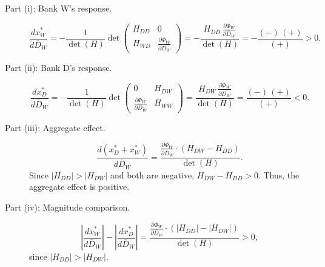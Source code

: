 \documentclass[12pt]{article}
\begin{document}
\begin{description}
    \item[Part (i): Bank W's response.]
    \begin{equation*}
    \frac{dx_{W}^{*}}{d\overline{D}_{W}} 
    = -\frac{1}{\det(H)} 
    \det\begin{pmatrix} H_{DD} & 0 \\ H_{WD} & \frac{\partial\Phi_{W}}{\partial\overline{D}_{W}} \end{pmatrix}
    = -\frac{H_{DD} \, \frac{\partial\Phi_{W}}{\partial\overline{D}_{W}}}{\det(H)}
    = -\frac{(-) \, (+)}{(+)} > 0.
    \end{equation*}
    \item[Part (ii): Bank D's response.]
    \begin{equation*}
    \frac{dx_{D}^{*}}{d\overline{D}_{W}} 
    = -\frac{1}{\det(H)} 
    \det\begin{pmatrix} 0 & H_{DW} \\ \frac{\partial\Phi_{W}}{\partial\overline{D}_{W}} & H_{WW} \end{pmatrix}
    = \frac{H_{DW} \, \frac{\partial\Phi_{W}}{\partial\overline{D}_{W}}}{\det(H)}
    = \frac{(-) \, (+)}{(+)} < 0.
    \end{equation*}
    \item[Part (iii): Aggregate effect.]
    \begin{equation*}
    \frac{d(x_{D}^{*}+x_{W}^{*})}{d\overline{D}_{W}} = \frac{\frac{\partial\Phi_{W}}{\partial\overline{D}_{W}} \cdot (H_{DW}-H_{DD})}{\det(H)}.
    \end{equation*}
    Since $|H_{DD}| > |H_{DW}|$ and both are negative, $H_{DW}-H_{DD} > 0$. Thus, the aggregate effect is positive.
    \item[Part (iv): Magnitude comparison.]
    \begin{equation*}
    \left|\frac{dx_{W}^{*}}{d\overline{D}_{W}}\right| - \left|\frac{dx_{D}^{*}}{d\overline{D}_{W}}\right| = \frac{\frac{\partial\Phi_{W}}{\partial\overline{D}_{W}} \cdot (|H_{DD}|-|H_{DW}|)}{\det(H)} > 0,
    \end{equation*}
    since $|H_{DD}| > |H_{DW}|$.
\end{description}
\end{document}
